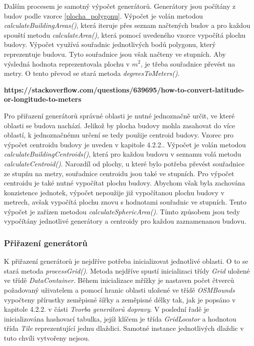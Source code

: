 Dalším procesem je samotný výpočet generátorů. Generátory jsou počítány z budov podle vzorce \ref{plocha_polygonu}. Výpočet je volán metodou \textit{calculateBuildingAreas()}, která iteruje přes seznam načtených budov a pro každou spouští metodu \textit{calculateArea()}, která pomocí uvedeného vzorce vypočítá plochu budovy. Výpočet využívá souřadnic jednotlivých bodů polygonu, který reprezentuje budovu. Tyto souřadnice jsou však načteny ve stupních. Aby výsledná hodnota reprezentovala plochu v $m^2$, je třeba souřadnice převést na metry. O tento převod se stará metoda \textit{degreesToMeters()}.

 \textbf{https://stackoverflow.com/questions/639695/how-to-convert-latitude-or-longitude-to-meters} 


Pro přiřazení generátorů správné oblasti je nutné jednoznačně určit, ve které oblasti se budova nachází. Jelikož by plocha budovy mohla zasahovat do více oblastí, k jednoznačnému určení se tedy použije centroid budovy. Vzorec pro výpočet centroidu budovy je uveden v kapitole 4.2.2.. Výpočet je volán metodou \textit{calculateBuildingCentroids()}, která pro každou budovu v seznamu volá metodu \textit{calculateCentroid()}. Narozdíl od plochy, u které bylo potřeba převést souřadnice ze stupňu na metry, souřadnice centroidu jsou také ve stupních. Pro výpočet centroidu je také nutné vypočítat plochu budovy. Abychom však byla zachována konzistence jednotek, výpočet nepoužije již vypočítanou plochu budovy v metrech, avšak vypočítá plochu znovu s hodnotami souřadnic ve stupních. Tento výpočet je zařízen metodou \textit{calculateSphericArea()}. Tímto způsobem jsou tedy vypočítány jednotlivé generátory a centroidy pro každou zaznamenanou budovu. 

\subsubsection{Přiřazení generátorů}

K přiřazení generátorů je nejdříve potřeba inicializovat jednotlivé oblasti. O to se stará metoda \textit{processGrid()}. Metoda nejdříve spustí inicializaci třídy \textit{Grid} uložené ve třídě \textit{DataContainer}. Během inicializace mřížky je nastaven počet čtverců požadovaný uživatelem a pomocí hranic oblasti uložené ve třídě \textit{OSMBounds} vypočteny přírustky zeměpisné šířky a zeměpisné délky tak, jak je popsáno v kapitole 4.2.2. v části \textit{Tvorba generátorů dopravy}. V poslední řadě je inicializována hashovací tabulka, jejíž klíčem je třída \textit{GridLocator} a hodnotou třída \textit{Tile} reprezentující jednu dlaždici. Samotné instance jednotlivých dlaždic v tuto chvíli vytvořeny nejsou. 

